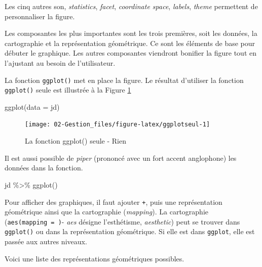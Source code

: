 \documentclass[
]{book}
\newenvironment{Shaded}{}{}
\newcommand{\AttributeTok}[1]{#1}
\newcommand{\FunctionTok}[1]{#1}
\newcommand{\NormalTok}[1]{#1}
\newcommand{\SpecialCharTok}[1]{#1}
\begin{document}
Les cinq autres son, \emph{statistics}, \emph{facet}, \emph{coordinate space}, \emph{labels}, \emph{theme} permettent de personnaliser la figure.

Les composantes les plus importantes sont les trois premières, soit les données, la cartographie et la représentation géométrique. Ce sont les éléments de base pour débuter le graphique. Les autres composantes viendront bonifier la figure tout en l'ajustant au besoin de l'utilisateur.

La fonction \texttt{ggplot()} met en place la figure. Le résultat d'utiliser la fonction \texttt{ggplot()} seule est illustrée à la Figure \ref{fig:ggplotseul}

\begin{Shaded}
\begin{Highlighting}[]
\FunctionTok{ggplot}\NormalTok{(}\AttributeTok{data =}\NormalTok{ jd)}
\end{Highlighting}
\end{Shaded}

\begin{figure}

{\centering \texttt{[image: 02-Gestion\_files/figure-latex/ggplotseul-1]} 

}

\caption{La fonction ggplot() seule - Rien}\label{fig:ggplotseul}
\end{figure}

Il est aussi possible de \emph{piper} (prononcé avec un fort accent anglophone) les données dans la fonction.

\begin{Shaded}
\begin{Highlighting}[]
\NormalTok{jd }\SpecialCharTok{\%\textgreater{}\%} 
  \FunctionTok{ggplot}\NormalTok{()}
\end{Highlighting}
\end{Shaded}

Pour afficher des graphiques, il faut ajouter \texttt{+}, puis une représentation géométrique ainsi que la cartographie (\emph{mapping}). La cartographie (\texttt{aes(mapping\ =\ )}- \emph{aes} désigne l'esthétisme, \emph{aesthetic}) peut se trouver dans \texttt{ggplot()} ou dans la représentation géométrique. Si elle est dans \texttt{ggplot}, elle est passée aux autres niveaux.

Voici une liste des représentations géométriques possibles.
\end{document}
